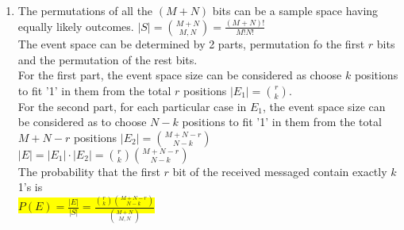\documentclass{article}
\begin{document}
\begin{enumerate}
\begin{enumerate}
	\end{enumerate}
	\item
	\begin{enumerate}
		\mysolu
		The permutations of all the $(M+N)$ bits can be a sample space having equally likely outcomes.
		${|S|={M+N \choose M,N}=\frac{(M+N)!}{M!N!}}$\\
		The event space can be determined by 2 parts, permutation fo the first ${r}$ bits and the permutation of the rest bits.\\
		For the first part, the event space size can be considered as choose ${k}$ positions to fit '1' in them from the total ${r}$ positions ${|E_1|={r \choose k}}$.\\
		For the second part, for each particular case in ${E_1}$, the event space size can be considered as to choose ${N-k}$ positions to fit '1' in them from the total ${M+N-r}$ positions ${|E_2|={M+N-r \choose N-k}}$\\
		${|E|= |E_1|\cdot |E_2| ={r \choose k}{M+N-r \choose N-k} }$\\	
		\myansw
		The probability that the first ${r}$ bit of the received messaged contain exactly ${k}$ 1's is\\
		\colorbox{yellow}{
			${P(E)=\frac{|E|}{|S|}=\frac{{r \choose k}{M+N-r \choose N-k}}{{M+N \choose M,N}}}$
		}\\
		

\end{enumerate}
\end{enumerate}
\end{document}
